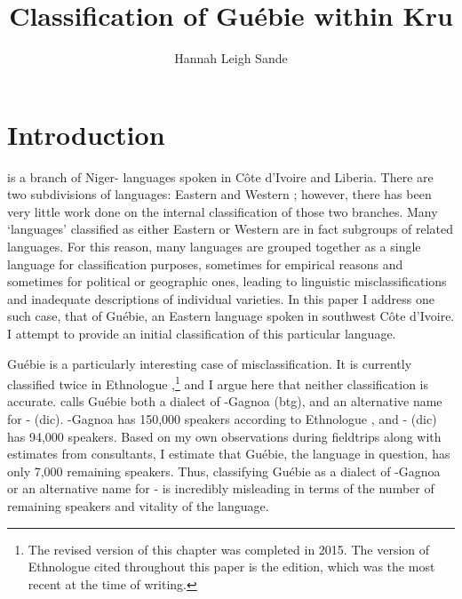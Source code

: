 \documentclass[output=paper,modfonts]{langscibook}
\title{Classification of Guébie within Kru}
\author{Hannah Leigh Sande}
\begin{document}
\maketitle
 
 
   


\section{Introduction}\label{sec:sande:Intro} 
 is a branch of Niger- languages spoken in Côte d'Ivoire and Liberia. There are two  subdivisions of  languages: Eastern and Western  \citep{Marchese1979}; however, there has been very little work done on the internal classification of those two branches. Many `languages' classified as either Eastern or Western  are in fact subgroups of related languages. For this reason, many  languages are grouped together as a single language for classification purposes, sometimes for empirical reasons and sometimes for political or geographic ones, leading to linguistic misclassifications and inadequate descriptions of individual  varieties. In this paper I address one such case, that of Guébie, an Eastern  language spoken in southwest Côte d'Ivoire. I attempt to provide an initial classification of this particular  language.

Guébie is a particularly interesting case of misclassification. It is currently classified twice in Ethnologue \citep{LewisEtAl2013},\footnote{The revised version of this chapter was completed in 2015. The version of Ethnologue cited throughout this paper is the \citeyear{LewisEtAl2013} edition, which was the most recent at the time of writing.} and I argue here that neither classification is accurate. \cite{LewisEtAl2013} calls Guébie both a dialect of -Gagnoa (btg), and an alternative name for - (dic). -Gagnoa has 150,000 speakers according to Ethnologue \citep{LewisEtAl2013}, and - (dic) has 94,000 speakers. Based on my own observations during fieldtrips along with estimates from consultants, I estimate that Guébie, the language in question, has only 7,000 remaining speakers. %
Thus, classifying Guébie as a dialect of -Gagnoa or an alternative name for - is incredibly misleading in terms of the number of remaining speakers and vitality of the language.
\end{document}
